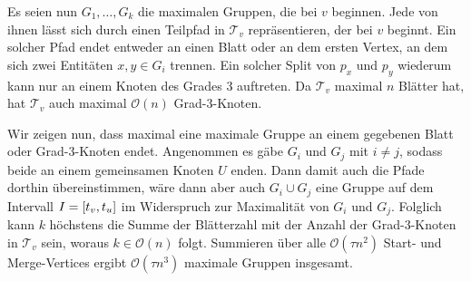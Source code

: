 \begin{beweis}
	Es seien nun $G_1, \ldots ,G_k$ die maximalen Gruppen, die bei $v$ beginnen.
	Jede von ihnen lässt sich durch einen Teilpfad in $\mathcal{T}_v$ repräsentieren, der bei $v$ beginnt.
	Ein solcher Pfad endet entweder an einen Blatt oder an dem ersten Vertex, an dem sich zwei Entitäten $x,y \in G_i$ trennen.
	Ein solcher Split von $p_x$ und $p_y$ wiederum kann nur an einem Knoten des Grades 3 auftreten.
	Da $\mathcal{T}_v$ maximal $n$ Blätter hat, hat $\mathcal{T}_v$ auch maximal $\mathcal{O}(n)$ Grad-3-Knoten.
	
	Wir zeigen nun, dass maximal eine maximale Gruppe an einem gegebenen Blatt oder Grad-3-Knoten endet.
	Angenommen es gäbe $G_i$ und $G_j$ mit $i \neq j$, sodass beide an einem gemeinsamen Knoten $U$ enden.
	Dann damit auch die Pfade dorthin übereinstimmen, wäre dann aber auch $G_i \cup G_j$ eine Gruppe auf dem Intervall $I=\benbrace*{t_v,t_u}$ im Widerspruch zur Maximalität von $G_i$ und $G_j$.
	Folglich kann $k$ höchstens die Summe der Blätterzahl mit der Anzahl der Grad-3-Knoten in $\mathcal{T}_v$ sein, woraus $k \in \mathcal{O}(n)$ folgt.
	Summieren über alle $\mathcal{O}(\tau n^2)$ Start- und Merge-Vertices ergibt $\mathcal{O}(\tau n^3)$ maximale Gruppen insgesamt.
\end{beweis}

